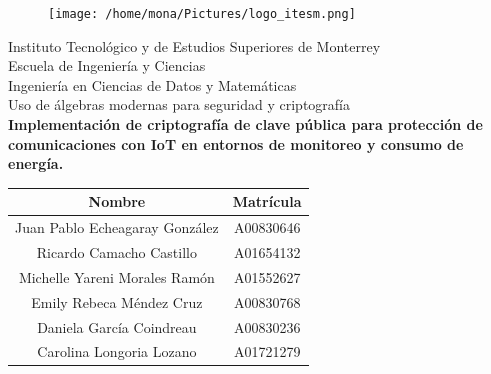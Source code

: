 \documentclass{article}
\begin{document}
    \begin{titlepage}
        \begin{center}
            \begin{figure}
                \centering
                \texttt{[image: /home/mona/Pictures/logo\_itesm.png]}\\ %
            \end{figure}
            \vspace{5cm}
            \LARGE{Instituto Tecnológico y de Estudios Superiores de Monterrey}\\
            \vspace{1cm}
            \large Escuela de Ingeniería y Ciencias \\
            \vspace{0.2cm}
            \large Ingeniería en Ciencias de Datos y Matemáticas \\
            \vspace{0.2cm}
            \large Uso de álgebras modernas para seguridad y criptografía \\
            \vspace{1cm}
            \textbf{Implementación de criptografía de clave pública para protección de comunicaciones con IoT en entornos de monitoreo y consumo de energía.}\\ %
            \vspace{0.7cm}
            \begin{table}[h!]
                \centering
                \begin{tabular}{ ||c|c|| }
                    \hline
                    Nombre & Matrícula \\
                    \hline
                    Juan Pablo Echeagaray González & A00830646 \\
                    \hline
                    Ricardo Camacho Castillo & A01654132 \\
                    \hline
                    Michelle Yareni Morales Ramón & A01552627 \\
                    \hline
                    Emily Rebeca Méndez Cruz & A00830768 \\
                    \hline
                    Daniela García Coindreau & A00830236 \\
                    \hline
                    Carolina Longoria Lozano & A01721279 \\

\end{tabular}
\end{table}
\end{center}
\end{titlepage}
\end{document}
